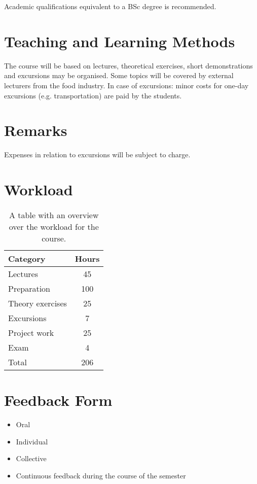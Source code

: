 Academic qualifications equivalent to a BSc degree is recommended.

\section{Teaching and Learning Methods}
The course will be based on lectures, theoretical exercises, short demonstrations and excursions may be organised. Some topics will be covered by external lecturers from the food industry. In case of excursions: minor costs for one-day excursions (e.g. transportation) are paid by the students.

\section{Remarks}
Expenses in relation to excursions will be subject to charge.

\section{Workload}
\begin{table}
    \centering
    \caption{A table with an overview over the workload for the course.}
    \label{tab:workload}
    \begin{tabular}{ l | c}
        \textbf{Category} & \textbf{Hours} \\ 
        \hline
        Lectures & 45 \\ 

        Preparation & 100 \\

        Theory exercises & 25 \\ 

        Excursions & 7 \\

        Project work & 25 \\

        Exam & 4 \\ 
        \hline
        Total & 206 \\ 
    \end{tabular}
\end{table}

\section{Feedback Form}
\begin{highlight}
    \begin{itemize}
        \item Oral
        \item Individual
        \item Collective
        \item Continuous feedback during the course of the semester
    \end{itemize}
\end{highlight}

